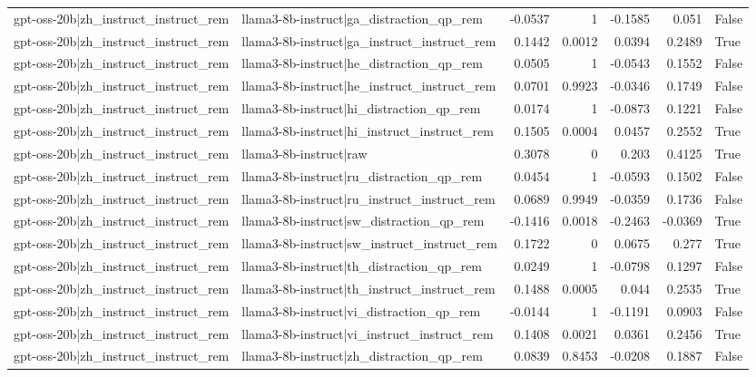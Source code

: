 \begin{table}
\begin{tabular}{l l r r r r l}
gpt-oss-20b|zh_instruct_instruct_rem & llama3-8b-instruct|ga_distraction_qp_rem & -0.0537 & 1 & -0.1585 & 0.051 & False \\
gpt-oss-20b|zh_instruct_instruct_rem & llama3-8b-instruct|ga_instruct_instruct_rem & 0.1442 & 0.0012 & 0.0394 & 0.2489 & True \\
gpt-oss-20b|zh_instruct_instruct_rem & llama3-8b-instruct|he_distraction_qp_rem & 0.0505 & 1 & -0.0543 & 0.1552 & False \\
gpt-oss-20b|zh_instruct_instruct_rem & llama3-8b-instruct|he_instruct_instruct_rem & 0.0701 & 0.9923 & -0.0346 & 0.1749 & False \\
gpt-oss-20b|zh_instruct_instruct_rem & llama3-8b-instruct|hi_distraction_qp_rem & 0.0174 & 1 & -0.0873 & 0.1221 & False \\
gpt-oss-20b|zh_instruct_instruct_rem & llama3-8b-instruct|hi_instruct_instruct_rem & 0.1505 & 0.0004 & 0.0457 & 0.2552 & True \\
gpt-oss-20b|zh_instruct_instruct_rem & llama3-8b-instruct|raw & 0.3078 & 0 & 0.203 & 0.4125 & True \\
gpt-oss-20b|zh_instruct_instruct_rem & llama3-8b-instruct|ru_distraction_qp_rem & 0.0454 & 1 & -0.0593 & 0.1502 & False \\
gpt-oss-20b|zh_instruct_instruct_rem & llama3-8b-instruct|ru_instruct_instruct_rem & 0.0689 & 0.9949 & -0.0359 & 0.1736 & False \\
gpt-oss-20b|zh_instruct_instruct_rem & llama3-8b-instruct|sw_distraction_qp_rem & -0.1416 & 0.0018 & -0.2463 & -0.0369 & True \\
gpt-oss-20b|zh_instruct_instruct_rem & llama3-8b-instruct|sw_instruct_instruct_rem & 0.1722 & 0 & 0.0675 & 0.277 & True \\
gpt-oss-20b|zh_instruct_instruct_rem & llama3-8b-instruct|th_distraction_qp_rem & 0.0249 & 1 & -0.0798 & 0.1297 & False \\
gpt-oss-20b|zh_instruct_instruct_rem & llama3-8b-instruct|th_instruct_instruct_rem & 0.1488 & 0.0005 & 0.044 & 0.2535 & True \\
gpt-oss-20b|zh_instruct_instruct_rem & llama3-8b-instruct|vi_distraction_qp_rem & -0.0144 & 1 & -0.1191 & 0.0903 & False \\
gpt-oss-20b|zh_instruct_instruct_rem & llama3-8b-instruct|vi_instruct_instruct_rem & 0.1408 & 0.0021 & 0.0361 & 0.2456 & True \\
gpt-oss-20b|zh_instruct_instruct_rem & llama3-8b-instruct|zh_distraction_qp_rem & 0.0839 & 0.8453 & -0.0208 & 0.1887 & False \\

\end{tabular}
\end{table}
